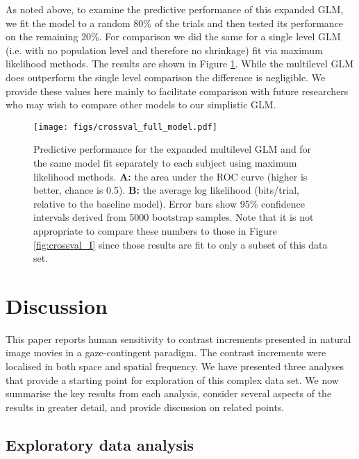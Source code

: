 \documentclass[11pt,a4paper]{article}
\begin{document}
{As noted above, to examine the predictive performance of this expanded GLM, we fit the model to a random 80\% of the trials and then tested its performance on the remaining 20\%.
For comparison we did the same for a single level GLM (i.e. with no population level and therefore no shrinkage) fit via maximum likelihood methods.
The results are shown in Figure \ref{fig:crossval_II}.
While the multilevel GLM does outperform the single level comparison the difference is negligible.
We provide these values here mainly to facilitate comparison with future researchers who may wish to compare other models to our simplistic GLM.

 \begin{figure}[H]
 \begin{center}
 \texttt{[image: figs/crossval\_full\_model.pdf]}
 \end{center}
 \caption{
Predictive performance for the expanded multilevel GLM and for the same model fit separately to each subject using maximum likelihood methods.
\textbf{A:} the area under the ROC curve (higher is better, chance is 0.5).
\textbf{B:}  the average log likelihood (bits/trial, relative to the baseline model).
Error bars show 95\% confidence intervals derived from 5000 bootstrap samples.
Note that it is not appropriate to compare these numbers to those in Figure \ref{fig:crossval_I} since those results are fit to only a subset of this data set.
 }
 \label{fig:crossval_II}
 \end{figure}




\section{Discussion}

This paper reports human sensitivity to contrast increments presented in natural image movies in a gaze-contingent paradigm.
The contrast increments were localised in both space and spatial frequency.
We have presented three analyses that provide a starting point for exploration of this complex data set.
We now summarise the key results from each analysis, consider several aspects of the results in greater detail, and provide discussion on related points.

\subsection{Exploratory data analysis}

}
\end{document}
